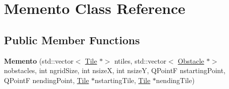 \hypertarget{class_memento}{}\section{Memento Class Reference}
\label{class_memento}
\subsection*{Public Member Functions}
\begin{DoxyCompactItemize}
\item 
\mbox{\label{class_memento_af1bfed292c6ff7b2d66c226ea81a8c67}} 
{\bfseries Memento} (std\+::vector$<$ \mbox{\hyperlink{class_tile}{Tile}} $\ast$$>$ ntiles, std\+::vector$<$ \mbox{\hyperlink{class_obstacle}{Obstacle}} $\ast$$>$ nobstacles, int ngrid\+Size, int nsizeX, int nsizeY, Q\+PointF nstarting\+Point, Q\+PointF nending\+Point, \mbox{\hyperlink{class_tile}{Tile}} $\ast$nstarting\+Tile, \mbox{\hyperlink{class_tile}{Tile}} $\ast$nending\+Tile)
\end{DoxyCompactItemize}
